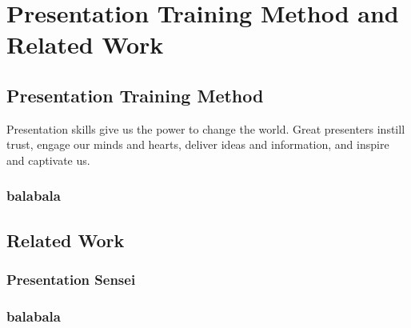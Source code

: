 \chapter[Presentation Training Method and Related Work]{Presentation Training Method and\\ Related Work}
\section{Presentation Training Method}
\par Presentation skills give us the power to change the world. Great presenters instill trust, engage our minds and hearts, deliver ideas and information, and inspire and captivate us.
\subsection{balabala}

\section{Related Work}

\subsection{Presentation Sensei}

\subsection{balabala}


